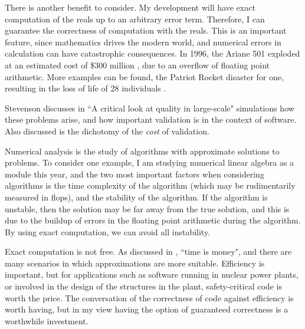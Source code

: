 \documentclass[ProjectReport]{subfiles}
\begin{document}

There is another benefit to consider. My development will have exact computation of the reals up to an arbitrary error term. Therefore, I can guarantee the correctness of computation with the reals. This is an important feature, since mathematics drives the modern world, and numerical errors in calculation can have catastrophic consequences. In 1996, the Ariane 501 exploded at an estimated cost of \$300 million \cite{ARIANE1}, due to an overflow of floating point arithmetic. More examples can be found, the Patriot Rocket disaster for one, resulting in the loss of life of 28 individuals \cite{office_patriot_nodate}. 

Stevenson discusses in ``A critical look at quality in large-scale" simulations \cite{QualityInSimulation} how these problems arise, and how important validation is in the context of software. Also discussed is the dichotomy of the \textit{cost} of validation. 

Numerical analysis is the study of algorithms with approximate solutions to problems. To consider one example, I am studying numerical linear algebra as a module this year, and the two most important factors when considering algorithms is the time complexity of the algorithm (which may be rudimentarily measured in flops), and the stability of the algorithm. If the algorithm is unstable, then the solution may be far away from the true solution, and this is due to the buildup of errors in the floating point arithmetic during the algorithm. By using exact computation, we can avoid all instability.

Exact computation is not free. As discussed in \cite{QualityInSimulation}, ``time is money", and there are many scenarios in which approximations are more suitable. Efficiency is important, but for applications such as software running in nuclear power plants, or involved in the design of the structures in the plant, safety-critical code is worth the price. The conversation of the correctness of code against efficiency is worth having, but in my view having the option of guaranteed correctness is a worthwhile investment.

\begin{comment}

Due to various choices of representation, my code does not have any claim to efficiency of computation, and even the real number 0 is not computable. The idea is that algorithms can be designed and implemented with isomorphic representations of the reals, which are built using more efficient representations of numbers.  


It will always be faster to approximate algorithms, but approximations of reals (or even rationals) will always introduce error, which propagates throughout algorithms.

\end{comment}
\end{document}
